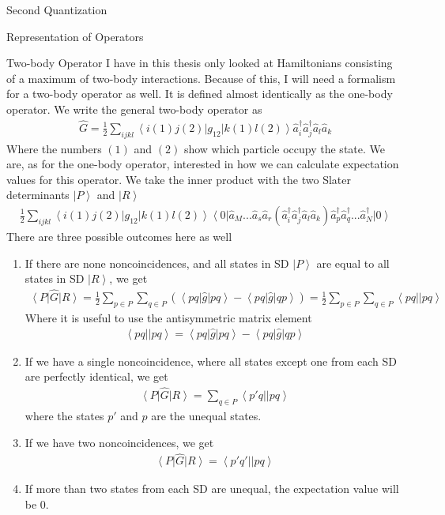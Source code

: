 \documentclass[twoside,english]{uiofysmaster}
\begin{document}
\begin{chapter}{Second Quantization}
\begin{section}{Representation of Operators}
		\begin{subsection}{Two-body Operator}
			I have in this thesis only looked at Hamiltonians consisting of a maximum of two-body interactions. Because of this, I will need a formalism for a two-body operator as well. It is defined almost identically as the one-body operator. We write the general two-body operator as
			\begin{align}
				\hat G = \frac{1}{2} \sum_{ijkl} \left< i(1) j(2) \right| g_{12} \left| k(1) l(2) \right> \hat a_i^\dagger \hat a_j^\dagger \hat a_l \hat a_k
			\end{align}
			Where the numbers $(1)$ and $(2)$ show which particle occupy the state. We are, as for the one-body operator, interested in how we can calculate expectation values for this operator. We take the inner product with the two Slater determinants $\left| P \right>$ and $\left| R\right>$
			\begin{align}
				\frac{1}{2} \sum_{ijkl} \left< i(1) j(2) \right| g_{12} \left| k(1) l(2) \right>   \left< 0 \right| \hat a_M ... \hat a_s \hat a_r (\hat a_i^\dagger \hat a_j^\dagger \hat a_l \hat a_k) \hat a_p^\dagger \hat a_q^\dagger ... \hat a_N^\dagger \left| 0 \right>
			\end{align}
			There are three possible outcomes here as well 
			\begin{enumerate}
				\item If there are none noncoincidences, and all states in SD $\left| P \right>$ are equal to all states in SD $\left| R \right>$, we get 
				\begin{align}
				 	\left< P \right| \hat G \left| R \right> = \frac{1}{2}\sum_{p \in P}\sum_{q \in P} (\left< pq\right| \hat g \left| pq \right> - \left< pq\right| \hat g \left| qp \right> ) = \frac{1}{2}\sum_{p \in P}\sum_{q \in P} \left< pq || pq \right>
				\end{align}
				Where it is useful to use the antisymmetric matrix element
				\begin{align}
					\left< pq || pq \right> = \left< pq\right| \hat g \left| pq \right> - \left< pq\right| \hat g \left| qp \right>  
				\end{align}
				\item If we have a single noncoincidence, where all states except one from each SD are perfectly identical, we get \cite{ShavittAndBartlett}
				\begin{align}
					\left< P \right| \hat G \left| R \right> = \sum_{q \in P} \left< p' q || p q \right>
				\end{align}
				where the states $p'$ and $p$ are the unequal states. 
				\item If we have two noncoincidences, we get 
				\begin{align}
					\left< P \right| \hat G \left| R \right> = \left< p' q' || p q \right> 
				\end{align}
				\item If more than two states from each SD are unequal, the expectation value will be $0$.
			\end{enumerate}
		\end{subsection}


\end{section}
\end{chapter}
\end{document}
